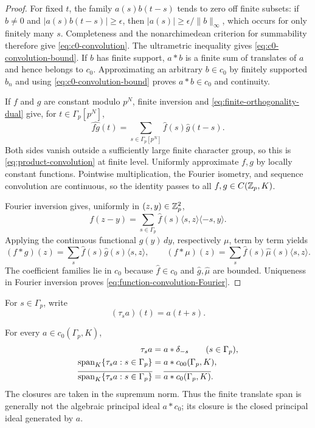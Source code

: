 \begin{proof}
For fixed $t$, the family $a(s)b(t-s)$ tends to zero off finite subsets:
if $b\ne0$ and $|a(s)b(t-s)|\geq\epsilon$, then
$|a(s)|\geq\epsilon/\|b\|_\infty$, which occurs for only finitely many
$s$.  Completeness and the nonarchimedean criterion for summability therefore
give \cref{eq:c0-convolution}.  The ultrametric inequality gives
\cref{eq:c0-convolution-bound}.  If $b$ has finite support, $a*b$ is a finite
sum of translates of $a$ and hence belongs to $c_0$.  Approximating an
arbitrary $b\in c_0$ by finitely supported $b_n$ and using
\cref{eq:c0-convolution-bound} proves $a*b\in c_0$ and continuity.

If $f$ and $g$ are constant modulo $p^N$, finite inversion and
\cref{eq:finite-orthogonality-dual} give, for $t\in\Gamma_p[p^N]$,
\[
 \widehat{fg}(t)
 =\sum_{s\in\Gamma_p[p^N]}\widehat f(s)\widehat g(t-s).
\]
Both sides vanish outside a sufficiently large finite character group, so
this is \cref{eq:product-convolution} at finite level.  Uniformly approximate
$f,g$ by locally constant functions.  Pointwise multiplication, the Fourier
isometry, and sequence convolution are continuous, so the identity passes to
all $f,g\in C(\mathbb Z_p,K)$.

Fourier inversion gives, uniformly in $(z,y)\in\mathbb Z_p^2$,
\[
 f(z-y)=\sum_{s\in\Gamma_p}
 \widehat f(s)\langle s,z\rangle\langle-s,y\rangle.
\]
Applying the continuous functional $g(y)\,dy$, respectively $\mu$, term by
term yields
\[
 (f*g)(z)=\sum_s\widehat f(s)\widehat g(s)\langle s,z\rangle,
 \qquad
 (f*\mu)(z)=\sum_s\widehat f(s)\widehat\mu(s)\langle s,z\rangle.
\]
The coefficient families lie in $c_0$ because $\widehat f\in c_0$ and
$\widehat g,\widehat\mu$ are bounded.  Uniqueness in Fourier inversion proves
\cref{eq:function-convolution-Fourier}.
\end{proof}

For $s\in\Gamma_p$, write
\[
 (\tau_sa)(t)=a(t+s).
\]

\begin{proposition}
\label{prop:finite-translates-principal-closure}
For every $a\in c_0(\Gamma_p,K)$,
\begin{align}
 \tau_sa&=a*\delta_{-s}\qquad(s\in\Gamma_p),
 \label{eq:translate-pointmass}\\
 \operatorname{span}_K\{\tau_sa:s\in\Gamma_p\}
 &=a*c_{00}(\Gamma_p,K),\label{eq:translate-span-c00}\\
 \overline{\operatorname{span}_K\{\tau_sa:s\in\Gamma_p\}}
 &=\overline{a*c_0(\Gamma_p,K)}.\label{eq:translate-ideal-closure}
\end{align}
The closures are taken in the supremum norm.  Thus the finite translate span
is generally not the algebraic principal ideal $a*c_0$; its closure is the
closed principal ideal generated by $a$.
\end{proposition}


